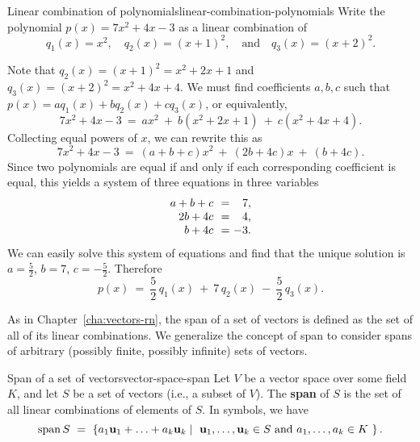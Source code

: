 \begin{example}{Linear combination of polynomials}{linear-combination-polynomials}
  Write the polynomial $p(x) = 7x^2 + 4x - 3$ as a linear combination%
   of
  \begin{equation*}
    q_1(x) = x^2,\quad
    q_2(x) = (x+1)^2,\quad\mbox{and}\quad
    q_3(x) = (x+2)^2.
  \end{equation*}
\end{example}

\begin{solution}
  Note that $q_2(x) = (x+1)^2 = x^2 + 2x + 1$ and
  $q_3(x) = (x+2)^2 = x^2 + 4x + 4$. We must find coefficients $a,b,c$
  such that $p(x) = aq_1(x) + bq_2(x) + cq_3(x)$, or equivalently,
  \begin{equation*}
    7x^2 + 4x - 3 ~=~ ax^2 ~+~ b(x^2 + 2x + 1) ~+~ c(x^2 + 4x + 4).
  \end{equation*}
  Collecting equal powers of $x$, we can rewrite this as
  \begin{equation*}
    7x^2 + 4x - 3 ~=~ (a+b+c)x^2 ~+~ (2b+4c)x ~+~ (b+4c).
  \end{equation*}
  Since two polynomials are equal if and only if each corresponding
  coefficient is equal, this yields a system of three equations in
  three variables
  \begin{equation*}
    \begin{array}{r@{~~}c@{~}r}
      a+b+c &=& 7, \\
      2b+4c &=& 4, \\
      b+4c &=& -3.
    \end{array}
  \end{equation*}
  We can easily solve this system of equations and find that the
  unique solution is $a=\frac{5}{2}$, $b=7$,
  $c=-\frac{5}{2}$. Therefore
  \begin{equation*}
    p(x) ~=~ \frac{5}{2}\,q_1(x) ~+~ 7\,q_2(x) ~-~ \frac{5}{2}\,q_3(x).
  \end{equation*}
\end{solution}

As in Chapter~\ref{cha:vectors-rn}, the span of a set of vectors is
defined as the set of all of its linear combinations. We generalize
the concept of span to consider spans of arbitrary (possibly finite,
possibly infinite) sets of vectors.

\begin{definition}{Span of a set of vectors}{vector-space-span}
  Let $V$ be a vector space over some field $K$, and let $S$ be a set
  of vectors (i.e., a subset of $V$). The \textbf{span}%
   of $S$ is the set of all linear
  combinations of elements of $S$. In symbols, we have
  \begin{equation*}
    \sspan S
    ~=~ \set{a_1\vect{u}_1+\ldots+a_k\vect{u}_k \mid
      \mbox{
        $\vect{u}_1,\ldots,\vect{u}_k\in S$
        and
        $a_1,\ldots,a_k\in K$
      }}.
  \end{equation*}
\end{definition}

